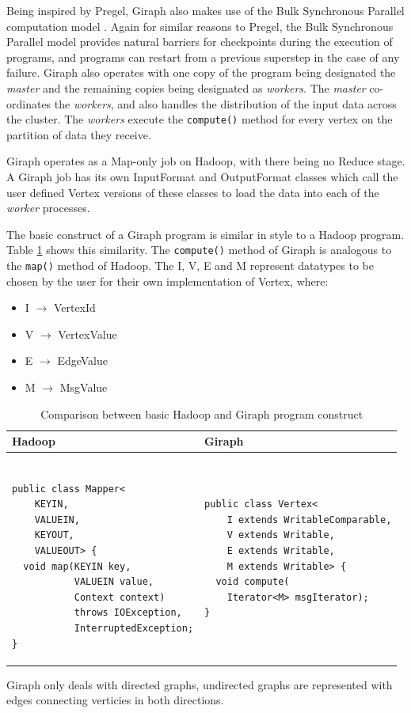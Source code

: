 Being inspired by Pregel, Giraph also makes use of the Bulk Synchronous Parallel computation model \cite{bsp}. Again for similar reasons to Pregel, the Bulk Synchronous Parallel model provides natural barriers for checkpoints during the execution of programs, and programs can restart from a previous superstep in the case of any failure. Giraph also operates with one copy of the program being designated the \emph{master} and the remaining copies being designated as \emph{workers}. The \emph{master} co-ordinates the \emph{workers}, and also handles the distribution of the input data across the cluster. The \emph{workers} execute the \verb/compute()/ method for every vertex on the partition of data they receive.

Giraph operates as a Map-only job on Hadoop, with there being no Reduce stage. A Giraph job has its own InputFormat and OutputFormat classes which call the user defined Vertex versions of these classes to load the data into each of the \emph{worker} processes.

The basic construct of a Giraph program is similar in style to a Hadoop program. Table \ref{tab:hadoopgiraph} shows this similarity. The \verb/compute()/ method of Giraph is analogous to the \verb/map()/ method of Hadoop. The I, V, E and M represent datatypes to be chosen by the user for their own implementation of Vertex, where:

\begin{itemize}
	\item I $\rightarrow$ VertexId
	\item V $\rightarrow$ VertexValue
	\item E $\rightarrow$ EdgeValue
	\item M $\rightarrow$ MsgValue
\end{itemize}

\begin{table}%
\centering
\begin{tabular}{|m{7.25cm}|m{7.25cm}|} \hline
Hadoop & Giraph \\ \hline
\begin{verbatim}

public class Mapper<
    KEYIN,
    VALUEIN,
    KEYOUT,
    VALUEOUT> {
  void map(KEYIN key,
           VALUEIN value,
           Context context)
           throws IOException,
           InterruptedException;
}
\end{verbatim} &
\begin{verbatim}
public class Vertex<
    I extends WritableComparable,
    V extends Writable,
    E extends Writable,
    M extends Writable> {
  void compute(
    Iterator<M> msgIterator);
}
\end{verbatim} \\
\hline
\end{tabular}
\caption{Comparison between basic Hadoop and Giraph program construct \cite{giraphtalk}}
\label{tab:hadoopgiraph}
\end{table}

Giraph only deals with directed graphs, undirected graphs are represented with edges connecting verticies in both directions.